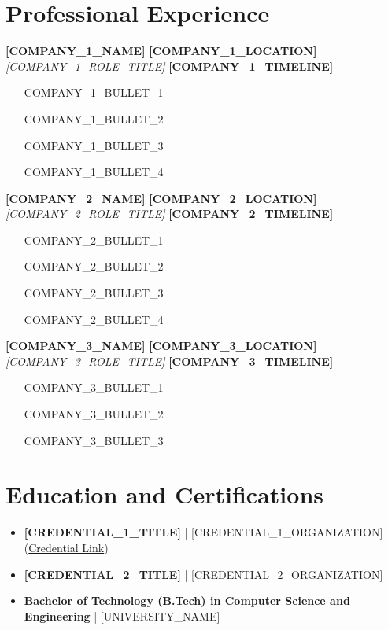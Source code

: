 \documentclass[9pt, letterpaper]{extarticle}
\begin{document}
\section{Professional Experience}

\textbf{[COMPANY_1_NAME]} \hfill \textbf{[COMPANY_1_LOCATION]} \\
\textit{[COMPANY_1_ROLE_TITLE]} \hfill \textbf{[COMPANY_1_TIMELINE]}
\begin{itemize}
    \item [COMPANY_1_BULLET_1]
    \item [COMPANY_1_BULLET_2]
    \item [COMPANY_1_BULLET_3]
    \item [COMPANY_1_BULLET_4]
\end{itemize}

\vspace{3pt}
\textbf{[COMPANY_2_NAME]} \hfill \textbf{[COMPANY_2_LOCATION]} \\
\textit{[COMPANY_2_ROLE_TITLE]} \hfill \textbf{[COMPANY_2_TIMELINE]}
\begin{itemize}
    \item [COMPANY_2_BULLET_1]
    \item [COMPANY_2_BULLET_2]
    \item [COMPANY_2_BULLET_3]
    \item [COMPANY_2_BULLET_4]
\end{itemize}

\vspace{3pt}
\textbf{[COMPANY_3_NAME]} \hfill \textbf{[COMPANY_3_LOCATION]} \\
\textit{[COMPANY_3_ROLE_TITLE]} \hfill \textbf{[COMPANY_3_TIMELINE]}
\begin{itemize}
    \item [COMPANY_3_BULLET_1]
    \item [COMPANY_3_BULLET_2]
    \item [COMPANY_3_BULLET_3]
\end{itemize}

\section{Education and Certifications}
\begin{itemize}
    \item \textbf{[CREDENTIAL_1_TITLE]} | [CREDENTIAL_1_ORGANIZATION] (\href{[CREDENTIAL_1_URL]}{Credential Link})
    \item \textbf{[CREDENTIAL_2_TITLE]} | [CREDENTIAL_2_ORGANIZATION]
    \item \textbf{Bachelor of Technology (B.Tech) in Computer Science and Engineering} | [UNIVERSITY_NAME]
\end{itemize}
\end{document}
